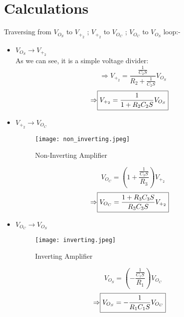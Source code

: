 \documentclass[conference]{IEEEtran}
\begin{document}
\section*{Calculations}
Traversing from $V_{O_S}$ to $V_{+_2}$ ; $V_{+_2}$ to $V_{O_C}$ ; $V_{O_C}$ to $V_{O_S}$ loop:-
\begin{itemize}
    \item $V_{O_S} \rightarrow V_{+_2}$
    \\ As we can see, it is a simple voltage divider:
    $$\Rightarrow  V_{+_2} = \frac{\frac{1}{C_2S}}{R_2+\frac{1}{C_2S}} V_{O_S}$$
    \begin{align}
    \Rightarrow\Aboxed{V_{+_2}=\frac{1}{1+R_2C_2S}V_{O_S}}   
    \end{align}

    \item $V_{+_2} \rightarrow V_{O_C}$
    \begin{figure}[h]
    \centering
    \texttt{[image: non\_inverting.jpeg]}
    \caption{Non-Inverting Amplifier}
    \end{figure}
    $$V_{O_C} = \left( 1+ \frac{\frac{1}{C_3S}}{R_3} \right) V_{+_2}$$
    \begin{align}
    \Rightarrow\Aboxed {V_{O_C} = \frac{1 + R_3C_3S}{R_3C_3S}V_{+_2}}
    \end{align}

    \item $V_{O_C} \rightarrow V_{O_S}$
    \begin{figure}[h]
    \centering
    \texttt{[image: inverting.jpeg]}
    \caption{Inverting Amplifier}
    \end{figure}
    $$V_{O_S} = \left( -\frac{\frac{1}{C_1S}}{R_1} \right) V_{O_C}$$
    \begin{align}
    \Rightarrow\Aboxed {V_{O_S} = -\frac{1}{R_1C_1S}V_{O_C}}
    \end{align}


\end{itemize}
\end{document}
